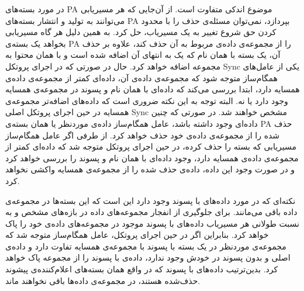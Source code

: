 در مورد بسته‌های PA موضوع اندکی متفاوت است. از آن‌جایی که هر مسیریابی می‌توانند به تولید و انتشار بسته‌های PA بپردازد، نمی‌توان مسئله‌ی حذف را با محدود کردن حق شروع تغییر به یک مسیریاب، حل کرد. به همین دلیل هر گاه مسیریابی بخواهد یک بسته‌ی PA را از مجموعه‌ی داده‌ی مربوط به آن حذف کند، علاوه بر حذف آن، یک بسته با همان نام که یک  به انتهای آن اضافه شده است و با همان محتوا به مجموعه اضافه خواهد کرد. حال در صورتی که در اجرای پروتکل Sync یکی از عامل‌های همگام‌ساز متوجه شود که مجموعه‌ی داده‌ی آن، داده‌ای کمتر از مجموعه‌ی داده‌ی همسایه دارد، ابتدا بررسی می‌کند که داده‌ای با همان نام و پسوند  در مجموعه‌ی همسایه وجود دارد یا نه. البته توجه به این نکته ضروری است که داده‌های اضافه‌تر مجموعه‌ی همسایه در حین اجرای پروتکل اصلی Sync مشخص خواهند شد. در صورتی که چنین داده‌ای وجود داشته باشد، عامل همگام‌ساز داده‌ی موردنظر یا همان بسته‌ی PA حذف شده را از مجموعه‌ی داده‌ی خود حذف خواهد کرد. از طرفی اگر عامل همگام‌ساز مسیریابی که بسته را حذف کرده، در حین اجرای پروتکل متوجه شد که داده‌ای کمتر از مجموعه‌ی داده‌ی همسایه دارد، وجود داده‌ای با همان نام و پسوند  را بررسی خواهد کرد و در صورت وجود این داده، داده‌ی حذف شده را از مجموعه‌ی همسایه واکشی نخواهد کرد.

نکته‌ای که در مورد داده‌های با پسوند  وجود دارد این است که این بسته‌ها در مجموعه‌ی داده باقی می‌مانند. برای جلوگیری از انفجار مجموعه‌های داده در بازه‌های مشخص و به نسبت طولانی هر مسیریاب داده‌های با پسوند  موجود در مجموعه‌های داده‌ی خود را پاک خواهد کرد. بنابراین اگر در حین اجرای پروتکل، عامل همگام‌ساز متوجه شد که مجموعه‌ی موردنظر در یک بسته با پسوند  با مجموعه‌ی همسایه تفاوت دارد و داده‌ی اصلی و بدون پسوند در خودش وجود ندارد، داده‌ی با پسوند را از مجموعه پاک خواهد کرد. بدین‌ترتیب داده‌های با پسوند  که در واقع همان بسته‌های اعلام‌کننده‌ی پیشوند حذف‌شده هستند، در مجموعه‌ی داده‌ها باقی نخواهند ماند.
